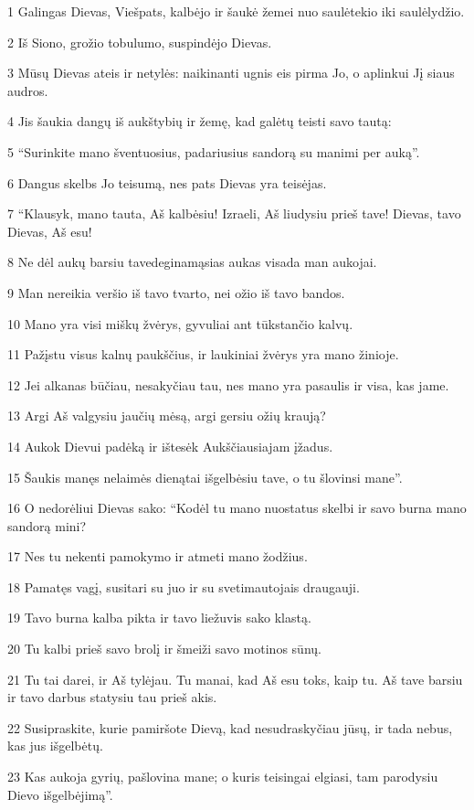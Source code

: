 \par 1 Galingas Dievas, Viešpats, kalbėjo ir šaukė žemei nuo saulėtekio iki saulėlydžio. 
\par 2 Iš Siono, grožio tobulumo, suspindėjo Dievas. 
\par 3 Mūsų Dievas ateis ir netylės: naikinanti ugnis eis pirma Jo, o aplinkui Jį siaus audros. 
\par 4 Jis šaukia dangų iš aukštybių ir žemę, kad galėtų teisti savo tautą: 
\par 5 “Surinkite mano šventuosius, padariusius sandorą su manimi per auką”. 
\par 6 Dangus skelbs Jo teisumą, nes pats Dievas yra teisėjas. 
\par 7 “Klausyk, mano tauta, Aš kalbėsiu! Izraeli, Aš liudysiu prieš tave! Dievas, tavo Dievas, Aš esu! 
\par 8 Ne dėl aukų barsiu tave­deginamąsias aukas visada man aukojai. 
\par 9 Man nereikia veršio iš tavo tvarto, nei ožio iš tavo bandos. 
\par 10 Mano yra visi miškų žvėrys, gyvuliai ant tūkstančio kalvų. 
\par 11 Pažįstu visus kalnų paukščius, ir laukiniai žvėrys yra mano žinioje. 
\par 12 Jei alkanas būčiau, nesakyčiau tau, nes mano yra pasaulis ir visa, kas jame. 
\par 13 Argi Aš valgysiu jaučių mėsą, argi gersiu ožių kraują? 
\par 14 Aukok Dievui padėką ir ištesėk Aukščiausiajam įžadus. 
\par 15 Šaukis manęs nelaimės dieną­tai išgelbėsiu tave, o tu šlovinsi mane”. 
\par 16 O nedorėliui Dievas sako: “Kodėl tu mano nuostatus skelbi ir savo burna mano sandorą mini? 
\par 17 Nes tu nekenti pamokymo ir atmeti mano žodžius. 
\par 18 Pamatęs vagį, susitari su juo ir su svetimautojais draugauji. 
\par 19 Tavo burna kalba pikta ir tavo liežuvis sako klastą. 
\par 20 Tu kalbi prieš savo brolį ir šmeiži savo motinos sūnų. 
\par 21 Tu tai darei, ir Aš tylėjau. Tu manai, kad Aš esu toks, kaip tu. Aš tave barsiu ir tavo darbus statysiu tau prieš akis. 
\par 22 Susipraskite, kurie pamiršote Dievą, kad nesudraskyčiau jūsų, ir tada nebus, kas jus išgelbėtų. 
\par 23 Kas aukoja gyrių, pašlovina mane; o kuris teisingai elgiasi, tam parodysiu Dievo išgelbėjimą”.



